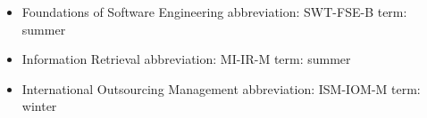 \begin{itemize}
	\item Foundations of Software Engineering
	\subitem abbreviation: SWT-FSE-B
	\subitem term: summer
	\item Information Retrieval
	\subitem abbreviation: MI-IR-M
	\subitem term: summer 
	\item International Outsourcing Management
	\subitem abbreviation: ISM-IOM-M
	\subitem term: winter 
\end{itemize}
